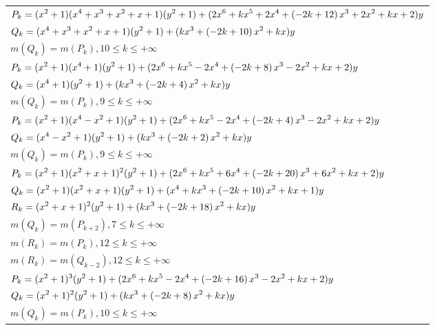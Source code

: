 \documentclass{amsart}
\begin{document}
\begin{longtable}{|l|}
\hline
\(\displaystyle P_k=(x^2
 + 1)(x^4
 + x^3
 + x^2
 + x
 + 1)(y^2+1)+(2\*x^6
 + k\*x^5
 + 2\*x^4
 + \left(-2\*k
 + 12\right) \*x^3
 + 2\*x^2
 + k\*x
 + 2)y\)\\
\(\displaystyle Q_k=(x^4
 + x^3
 + x^2
 + x
 + 1)(y^2+1)+(k\*x^3
 + \left(-2\*k
 + 10\right) \*x^2
 + k\*x)y\)\\
\(\displaystyle m(Q_k) = m(P_{k}),10 \leqslant k \leqslant +\infty\)\\
\hline
\(\displaystyle P_k=(x^2
 + 1)(x^4
 + 1)(y^2+1)+(2\*x^6
 + k\*x^5
 - 2\*x^4
 + \left(-2\*k
 + 8\right) \*x^3
 - 2\*x^2
 + k\*x
 + 2)y\)\\
\(\displaystyle Q_k=(x^4
 + 1)(y^2+1)+(k\*x^3
 + \left(-2\*k
 + 4\right) \*x^2
 + k\*x)y\)\\
\(\displaystyle m(Q_k) = m(P_{k}),9 \leqslant k \leqslant +\infty\)\\
\hline
\(\displaystyle P_k=(x^2
 + 1)(x^4
 - x^2
 + 1)(y^2+1)+(2\*x^6
 + k\*x^5
 - 2\*x^4
 + \left(-2\*k
 + 4\right) \*x^3
 - 2\*x^2
 + k\*x
 + 2)y\)\\
\(\displaystyle Q_k=(x^4
 - x^2
 + 1)(y^2+1)+(k\*x^3
 + \left(-2\*k
 + 2\right) \*x^2
 + k\*x)y\)\\
\(\displaystyle m(Q_k) = m(P_{k}),9 \leqslant k \leqslant +\infty\)\\
\hline
\(\displaystyle P_k=(x^2
 + 1)(x^2
 + x
 + 1)^{2}(y^2+1)+(2\*x^6
 + k\*x^5
 + 6\*x^4
 + \left(-2\*k
 + 20\right) \*x^3
 + 6\*x^2
 + k\*x
 + 2)y\)\\
\(\displaystyle Q_k=(x^2
 + 1)(x^2
 + x
 + 1)(y^2+1)+(x^4
 + k\*x^3
 + \left(-2\*k
 + 10\right) \*x^2
 + k\*x
 + 1)y\)\\
\(\displaystyle R_k=(x^2
 + x
 + 1)^{2}(y^2+1)+(k\*x^3
 + \left(-2\*k
 + 18\right) \*x^2
 + k\*x)y\)\\
\(\displaystyle m(Q_k) = m(P_{k
 + 2}),7 \leqslant k \leqslant +\infty\)\\
\(\displaystyle m(R_k) = m(P_{k}),12 \leqslant k \leqslant +\infty\)\\
\(\displaystyle m(R_k) = m(Q_{k
 - 2}),12 \leqslant k \leqslant +\infty\)\\
\hline
\(\displaystyle P_k=(x^2
 + 1)^{3}(y^2+1)+(2\*x^6
 + k\*x^5
 - 2\*x^4
 + \left(-2\*k
 + 16\right) \*x^3
 - 2\*x^2
 + k\*x
 + 2)y\)\\
\(\displaystyle Q_k=(x^2
 + 1)^{2}(y^2+1)+(k\*x^3
 + \left(-2\*k
 + 8\right) \*x^2
 + k\*x)y\)\\
\(\displaystyle m(Q_k) = m(P_{k}),10 \leqslant k \leqslant +\infty\)\\

\end{longtable}
\end{document}
